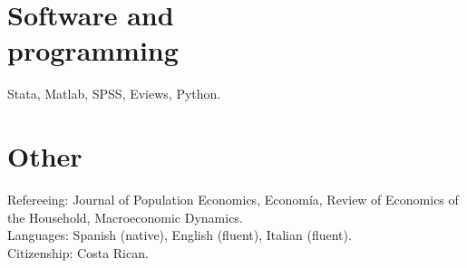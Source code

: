 \documentclass[margin]{res} %
\begin{document}
\begin{resume}
%

\section{Software and \\ programming}
Stata, Matlab, SPSS, Eviews, Python. \\

\section{Other}
Refereeing: Journal of Population Economics, Econom\'ia, Review of Economics of the Household, Macroeconomic Dynamics. \\
Languages: Spanish (native), English (fluent), Italian (fluent). \\
Citizenship: Costa Rican.





\end{resume}
\end{document}
